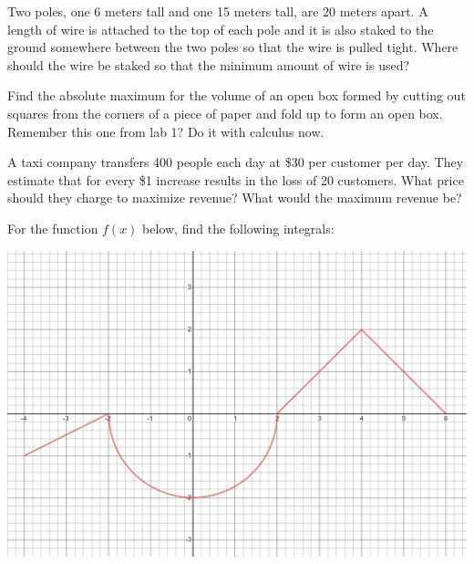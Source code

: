 \documentclass[11pt]{exam}
\begin{document}
	\begin{questions}
		
		\addpoints
		
		\question[5] Two poles, one 6 meters tall and one 15 meters tall, are 20 meters apart.  A length of wire is attached to the top of each pole and it is also staked to the ground somewhere between the two poles so that the wire is pulled tight.  Where should the wire be staked so that the minimum amount of wire is used?
		
		\question[5] Find the absolute maximum for the volume of an open box formed by cutting out squares from the corners of a piece of paper and fold up to form an open box.  Remember this one from lab 1?  Do it with calculus now.
		
		\question[5] A taxi company transfers 400 people each day at \$30 per customer per day.  They estimate that for every \$1 increase results in the loss of 20 customers.  What price should they charge to maximize revenue?  What would the maximum revenue be?
		
		\newpage
		
		\question[5] For the function $f(x)$ below, find the following integrals:
		
		\includegraphics[width = 6 in]{images/integrate_this.png}
		
		\begin{multicols}{2}
\end{multicols}
\end{questions}
\end{document}
